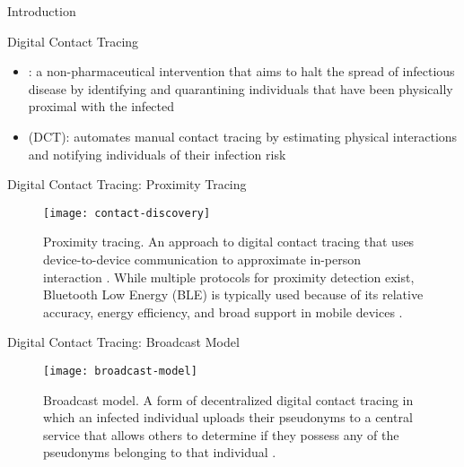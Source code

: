 \documentclass[11pt]{beamer}
\begin{document}
\begin{frame}
	\maketitle
\end{frame}

\begin{section}{Introduction}

\begin{frame}{Digital Contact Tracing}
\begin{itemize}
  \item {}: a non-pharmaceutical intervention that aims to halt the spread of infectious disease by identifying and quarantining individuals that have been physically proximal with the infected \citep{PozoMartin2023}
  \pause
  \item {} (DCT): automates manual contact tracing by estimating physical interactions and notifying individuals of their infection risk \citep{Reichert2021}
\end{itemize}
\end{frame}

\begin{frame}{Digital Contact Tracing: Proximity Tracing}
\begin{figure}
  \centering
  \texttt{[image: contact-discovery]}
  \caption[Proximity tracing]{Proximity tracing. An approach to digital contact tracing that uses device-to-device communication to approximate in-person interaction \cite{Reichert2021}. While multiple protocols for proximity detection exist, Bluetooth Low Energy (BLE) is typically used because of its relative accuracy, energy efficiency, and broad support in mobile devices \citep{Shubina2020, Reichert2021}.}
\end{figure}
\end{frame}

\begin{frame}{Digital Contact Tracing: Broadcast Model}
\begin{figure}
  \centering
  \texttt{[image: broadcast-model]}
  \caption[Broadcast model]{Broadcast model. A form of decentralized digital contact tracing in which an infected individual uploads their pseudonyms to a central service that allows others to determine if they possess any of the pseudonyms belonging to that individual \cite{Reichert2021}.}
\end{figure}
\end{frame}


\end{section}
\end{document}
